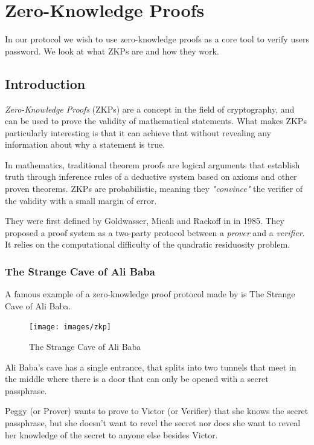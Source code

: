 \section{Zero-Knowledge Proofs}
In our protocol we wish to use zero-knowledge proofs as a core tool to verify users password. We look at what ZKPs are and how they work.

\subsection{Introduction}
\textit{Zero-Knowledge Proofs} (ZKPs) are a concept in the field of cryptography, and can be used to prove the validity of mathematical statements. What makes ZKPs particularly interesting is that it can achieve that without revealing any information about why a statement is true.

In mathematics, traditional theorem proofs are logical arguments that establish truth through inference rules of a deductive system based on axioms and other proven theorems.
 ZKPs are probabilistic, meaning they \textit{"convince"} the verifier of the validity with a small margin of error.

They were first defined by Goldwasser, Micali and Rackoff in \cite{GMR} in 1985. 
They proposed a proof system as a two-party protocol between a \textit{prover} and a \textit{verifier}. It relies on the computational difficulty of the quadratic residuosity problem.
\newpage
\subsubsection{The Strange Cave of Ali Baba}
A famous example of a zero-knowledge proof protocol made by \cite{QJM} is The Strange Cave of Ali Baba.

\begin{figure}[h]
	\centering
	\texttt{[image: images/zkp]}
	\caption{The Strange Cave of Ali Baba}
	\label{fig:strange-cave-of-alibaba}
\end{figure}

\bigskip

Ali Baba's cave has a single entrance, that splits into two tunnels that meet in the middle where there is a door that can only be opened with a secret passphrase.

\bigskip

Peggy (or Prover) wants to prove to Victor (or Verifier) that she knows the secret passphrase, but she doesn't want to revel the secret nor does she want to reveal her knowledge of the secret to anyone else besides Victor.

